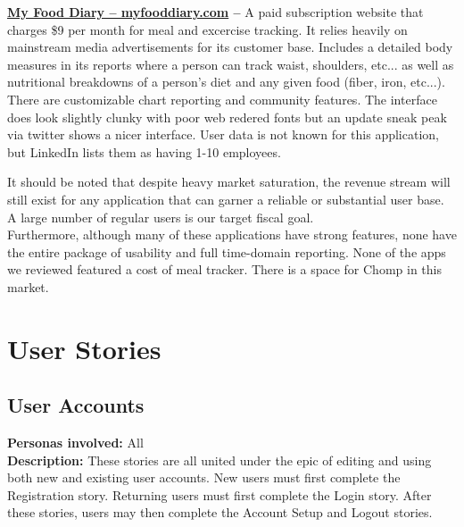 \documentclass[a4paper,12pt]{article}
\begin{document}
\begin{list}{•}{•}
\item \textbf{\href{http://www.myfooddiary.com}{My Food Diary -- myfooddiary.com} -- }A paid subscription website that charges \$9 per month for meal and excercise tracking.  It relies heavily on mainstream media advertisements for its customer base.  Includes a detailed body measures in its reports where a person can track waist, shoulders, etc... as well as nutritional breakdowns of a person's diet and any given food (fiber, iron, etc...).  There are customizable chart reporting and community features. The interface does look slightly clunky with poor web redered fonts but an update sneak peak via twitter shows a nicer interface.  User data is not known for this application, but LinkedIn lists them as having 1-10 employees.
\end{list}
It should be noted that despite heavy market saturation, the revenue stream will still exist for any application that can garner a reliable or substantial user base.  A large number of regular users is our target fiscal goal.\\
Furthermore, although many of these applications have strong features, none have the entire package of usability and full time-domain reporting.  None of the apps we reviewed featured a cost of meal tracker.  There is a space for Chomp in this market.
\section{User Stories}
\subsection{User Accounts}
\textbf{Personas involved:} All\\
\textbf{Description:} These stories are all united under the epic of editing and using both new and existing user accounts.  New users must first complete the Registration story.  Returning users must first complete the Login story.  After these stories, users may then complete the Account Setup and Logout stories.
\end{document}
